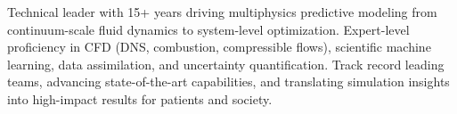 Technical leader with 15+ years driving multiphysics predictive modeling from continuum-scale fluid dynamics to system-level optimization. Expert-level proficiency in CFD (DNS, combustion, compressible flows), scientific machine learning, data assimilation, and uncertainty quantification. Track record leading teams, advancing state-of-the-art capabilities, and translating simulation insights into high-impact results for patients and society.